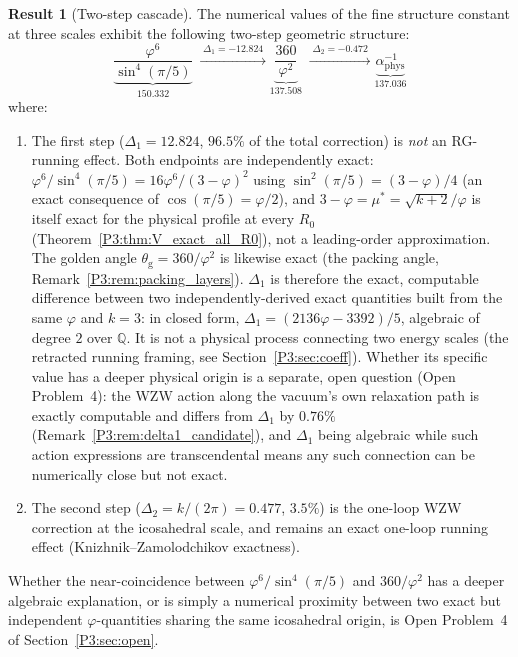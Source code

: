 \documentclass[11pt,a4paper]{article}
\theoremstyle{definition}
\newtheorem{result}[theorem]{Result}
\theoremstyle{remark}
\newcommand{\vp}{\varphi}
\newcommand{\aInv}{\alpha^{-1}}
\newcommand{\thetaG}{\theta_{\mathrm{g}}}
\begin{document}
\begin{result}[Two-step cascade]
\label{P3:prop:cascade}
The numerical values of the fine structure constant at three scales
exhibit the following two-step geometric structure:
\begin{equation}
  \underbrace{\frac{\vp^6}{\sin^4(\pi/5)}}_{150.332}
  \;\xrightarrow{\;\Delta_1 = -12.824\;}
  \underbrace{\frac{360}{\vp^2}}_{137.508}
  \;\xrightarrow{\;\Delta_2 = -0.472\;}
  \underbrace{\aInv_{\mathrm{phys}}}_{137.036}
  \label{P3:eq:cascade}
\end{equation}
where:
\begin{enumerate}[noitemsep]
  \item The first step ($\Delta_1 = 12.824$, $96.5\%$ of the total
    correction) is \emph{not} an RG-running effect. Both endpoints are
    independently exact: $\vp^6/\sin^4(\pi/5) = 16\vp^6/(3-\vp)^2$ using
    $\sin^2(\pi/5)=(3-\vp)/4$ (an exact consequence of $\cos(\pi/5)=\vp/2$),
    and $3-\vp=\mu^*=\sqrt{k+2}/\vp$ is itself exact for the physical
    profile at every $R_0$ (Theorem~\ref{P3:thm:V_exact_all_R0}), not a
    leading-order approximation.  The golden angle $\thetaG=360/\vp^2$ is
    likewise exact (the packing angle, Remark~\ref{P3:rem:packing_layers}).
    $\Delta_1$ is therefore the exact, computable difference between two
    independently-derived exact quantities built from the same $\vp$ and
    $k=3$: in closed form, $\Delta_1=(2136\vp-3392)/5$, algebraic of
    degree $2$ over $\mathbb{Q}$. It is not a physical process connecting
    two energy scales (the retracted running framing, see
    Section~\ref{P3:sec:coeff}). Whether its specific value has a deeper
    physical origin is a separate, open question (Open Problem~4): the
    WZW action along the vacuum's own relaxation path is exactly
    computable and differs from $\Delta_1$ by $0.76\%$
    (Remark~\ref{P3:rem:delta1_candidate}), and $\Delta_1$ being
    algebraic while such action expressions are transcendental means
    any such connection can be numerically close but not exact.
  \item The second step ($\Delta_2 = k/(2\pi) = 0.477$, $3.5\%$) is the
    one-loop WZW correction at the icosahedral scale, and remains an
    exact one-loop running effect (Knizhnik--Zamolodchikov
    exactness).
\end{enumerate}
Whether the near-coincidence between $\vp^6/\sin^4(\pi/5)$ and
$360/\vp^2$ has a deeper algebraic explanation, or is simply a numerical
proximity between two exact but independent $\vp$-quantities sharing the
same icosahedral origin, is Open Problem~4 of Section~\ref{P3:sec:open}.
\end{result}
\end{document}

